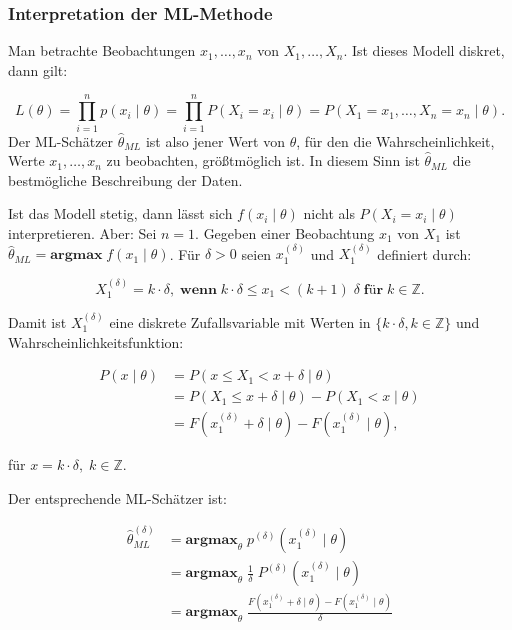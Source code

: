 \documentclass[10pt]{article}
\newcommand{\FZV}{X_1, \ldots, X_n} %
\newcommand{\xt}{x \mid \theta} %
\begin{document}
	\subsubsection{Interpretation der ML-Methode}
	Man betrachte Beobachtungen $x_1, \ldots , x_n$ von $\FZV$. Ist dieses Modell diskret, dann gilt: 
	
	\begin{equation*}
		L(\theta)=\prod_{i=1}^{n} p(x_i \mid \theta) = \prod_{i=1}^{n} P (X_i = x_i \mid \theta) = P(X_1 = x_1, \ldots, X_n = x_n \mid \theta).
	\end{equation*}
	Der ML-Schätzer $\hat{\theta}_{ML}$ ist also jener Wert von $\theta$, für den die Wahrscheinlichkeit, Werte $x_1,\ldots,x_n$ zu beobachten, größtmöglich ist. In diesem Sinn ist $\hat{\theta}_{ML}$ die bestmögliche Beschreibung der Daten.
	
	Ist das Modell stetig, dann lässt sich $f(x_i \mid \theta)$ nicht als $P(X_i = x_i \mid \theta)$ interpretieren. Aber: Sei $n=1$. Gegeben einer Beobachtung  $x_1$ von $X_1$ ist $\hat{\theta}_{ML} = \textbf{argmax} \; f(x_1 \mid \theta)$. Für $\delta > 0$ seien $x^{\left(\delta\right)}_1$ und $X^{\left(\delta\right)}_1$ definiert durch: 
	
	\begin{equation*}
		X^{\left(\delta\right)}_1 = k \cdot \delta, \;\textbf{wenn} \; k\cdot\delta \leq x_1 < (k+1) \; \delta \; \textbf{für} \; k \in \mathbb{Z}.
	\end{equation*}
	
	Damit ist $X^{\left(\delta\right)}_1$ eine diskrete Zufallsvariable mit Werten in $\{k\cdot\delta, k\in \mathbb{Z}\}$ und Wahrscheinlichkeitsfunktion:
	
	\begin{equation*}
		\begin{split}
			P(\xt) &= P (x\leq X_1 < x+ \delta \mid \theta) \\
			&= P (X_1 \leq x + \delta \mid \theta) - P (X_1 < x \mid \theta) \\
			&= F(x^{\left(\delta\right)}_1 + \delta \mid \theta) - F(x^{\left(\delta\right)}_1 \mid \theta),
		\end{split}
	\end{equation*}
	
	für $x = k \cdot \delta, \; k \in \mathbb{Z}$.
	
	Der entsprechende ML-Schätzer ist:
	
	\begin{equation*}
		\begin{split}
			\hat{\theta}_{ML}^{\left(\delta\right)} &= \textbf{argmax}_\theta  \; p^{\left(\delta\right)} (x^{\left(\delta\right)}_1 \mid \theta)\\
			&= \textbf{argmax}_\theta \; \frac{1}{\delta} \; P^{\left(\delta\right)} (x^{\left(\delta\right)}_1 \mid \theta)\\
			&= \textbf{argmax}_\theta \; \frac{F(x^{\left(\delta\right)}_1 + \delta \mid \theta) - F(x^{\left(\delta\right)}_1 \mid \theta)}{\delta}
		\end{split}
	\end{equation*}
	
\end{document}
